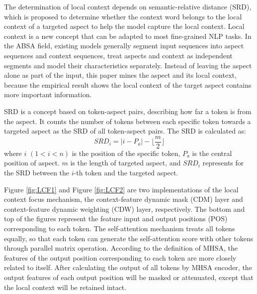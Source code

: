 \documentclass[a4paper,fleqn]{cas-sc}
\begin{document}
The determination of local context depends on semantic-relative distance (SRD), which is proposed to determine whether the context word belongs to the local context of a targeted aspect to help the model capture the local context. Local context is a new concept that can be adapted to most fine-grained NLP tasks. In the ABSA field, existing models generally segment input sequences into aspect sequences and context sequences, treat aspects and context as independent segments and model their characteristics separately. Instead of leaving the aspect alone as part of the input, this paper mines the aspect and its local context, because the empirical result shows the local context of the target aspect contains more important information.

SRD is a concept based on token-aspect pairs, describing how far a token is from the aspect. It counts the number of tokens between each specific token towards a targeted aspect as the SRD of all token-aspect pairs. The SRD is calculated as:
\begin{equation}
SRD_{i} = |i-P_{a}|-\lfloor\frac{m}{2}\rfloor
\end{equation}
where $i$ $(1<i<n)$ is the position of the specific token, $P_{a}$ is the central position of aspect. $m$ is the length of targeted aspect, and $SRD_{i}$ represents for the SRD between the $ i $-th token and the targeted aspect.

\begin{figure*}[pos=h]
	\centering
\caption{The simulation of the context-feature dynamic mask (CDM) mechanism. The arrows mean the contribution of the token in the computation of the self-attention score to arrowed positions (POS). And the features of the output position that the dotted arrow points to will be masked.}
	\label{fig:LCF1}
\end{figure*}

\begin{figure*}[pos=h]
	\centering
\caption{The simulation of the context-feature dynamic weighting (CDW) mechanism. The features of the output position (POS) that the dotted arrow points to will be weighted decay.}
	\label{fig:LCF2}
\end{figure*}

Figure \ref{fig:LCF1} and Figure \ref{fig:LCF2} are two implementations of the local context focus mechanism, the context-feature dynamic mask (CDM) layer and context-feature dynamic weighting (CDW) layer, respectively. The bottom and top of the figures represent the feature input and output positions (POS) corresponding to each token. The self-attention mechanism treats all tokens equally, so that each token can generate the self-attention score with other tokens through parallel matrix operation. According to the definition of MHSA, the features of the output position corresponding to each token are more closely related to itself. After calculating the output of all tokens by MHSA encoder, the output features of each output position will be masked or attenuated, except that the local context will be retained intact.
\end{document}
